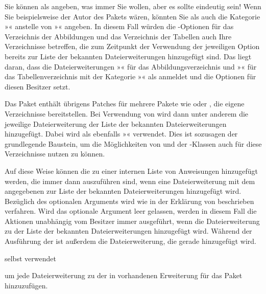 Sie können als  angeben, was immer Sie wollen, aber es sollte
eindeutig sein! Wenn Sie beispielsweise der Autor des Pakets 
wären, könnten Sie als  auch die Kategorie »«
anstelle von »« angeben. In diesem Fall würden die
\KOMAScript-Optionen%
 für das Verzeichnis der Abbildungen
und das Verzeichnis der Tabellen auch Ihre Verzeichnisse betreffen, die zum
Zeitpunkt der Verwendung der jeweiligen Option bereits zur Liste der bekannten
Dateierweiterungen hinzugefügt sind. Das liegt daran, dass \KOMAScript{} die
Dateierweiterungen »« für das Abbildungsverzeichnis und
»« für das Tabellenverzeichnis mit der Kategorie »«
als  anmeldet und die Optionen für diesen Besitzer setzt.

Das Paket \hyperref[cha:scrhack]{}%
 enthält übrigens
Patches für mehrere Pakete wie  oder , die
eigene Verzeichnisse bereitstellen. Bei Verwendung von
\hyperref[cha:scrhack]{} wird dann unter anderem die
jeweilige Dateierweiterung der Liste der bekannten Dateierweiterungen
hinzugefügt. Dabei wird als  ebenfalls »«
verwendet. Dies ist sozusagen der grundlegende Baustein, um die Möglichkeiten
von  und der \KOMAScript-Klassen auch für diese
Verzeichnisse nutzen zu können.%
\EndIndexGroup


\begin{Declaration}
\end{Declaration}
Auf diese Weise können die  zu einer internen Liste von
Anweisungen hinzugefügt werden, die immer dann auszuführen sind, wenn eine
Dateierweiterung mit dem angegebenen  zur Liste der bekannten
Dateierweiterungen hinzugefügt wird. Bezüglich des optionalen Arguments wird
wie in der Erklärung von  beschrieben
verfahren. Wird das optionale Argument leer gelassen, werden in diesem Fall
die Aktionen unabhängig vom Besitzer immer ausgeführt, wenn die
Dateierweiterung zu der Liste der bekannten Dateierweiterungen hinzugefügt
wird. Während der Ausführung der  ist außerdem
 die
Dateierweiterung, die gerade hinzugefügt wird.
\begin{Example}
   selbst verwendet
\begin{lstcode}
  \AtAddToTocList[]{%
    \expandafter\tocbasic@extend@babel
    \expandafter{\@currext}}
\end{lstcode}
  um jede Dateierweiterung zu der in  vorhandenen
  Erweiterung für das Paket  hinzuzufügen. 
\end{Example}

